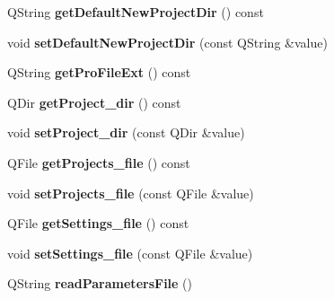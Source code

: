 \begin{DoxyCompactItemize}
\item 
Q\+String {\bfseries get\+Default\+New\+Project\+Dir} () const \hypertarget{class_app_settings_a8e09af00975757da8cd520b44db8b4cb}{}\label{class_app_settings_a8e09af00975757da8cd520b44db8b4cb}

\item 
void {\bfseries set\+Default\+New\+Project\+Dir} (const Q\+String \&value)\hypertarget{class_app_settings_a2416714eba17ee60f384cad00124fb9e}{}\label{class_app_settings_a2416714eba17ee60f384cad00124fb9e}

\item 
Q\+String {\bfseries get\+Pro\+File\+Ext} () const \hypertarget{class_app_settings_a540fcd15c9330cc015fab2f43aa79fc1}{}\label{class_app_settings_a540fcd15c9330cc015fab2f43aa79fc1}

\item 
Q\+Dir {\bfseries get\+Project\+\_\+dir} () const \hypertarget{class_app_settings_adc3c9af982f7e368ad741bee099010e0}{}\label{class_app_settings_adc3c9af982f7e368ad741bee099010e0}

\item 
void {\bfseries set\+Project\+\_\+dir} (const Q\+Dir \&value)\hypertarget{class_app_settings_a3060913c5f052852f5a2aa2802351c63}{}\label{class_app_settings_a3060913c5f052852f5a2aa2802351c63}

\item 
Q\+File {\bfseries get\+Projects\+\_\+file} () const \hypertarget{class_app_settings_a5b244cc47342a3a207a4bf855ef5660d}{}\label{class_app_settings_a5b244cc47342a3a207a4bf855ef5660d}

\item 
void {\bfseries set\+Projects\+\_\+file} (const Q\+File \&value)\hypertarget{class_app_settings_a0546a786ddf98f93187d7506e1a14e1c}{}\label{class_app_settings_a0546a786ddf98f93187d7506e1a14e1c}

\item 
Q\+File {\bfseries get\+Settings\+\_\+file} () const \hypertarget{class_app_settings_afe4308305b3178d6fa6f4adc767988a6}{}\label{class_app_settings_afe4308305b3178d6fa6f4adc767988a6}

\item 
void {\bfseries set\+Settings\+\_\+file} (const Q\+File \&value)\hypertarget{class_app_settings_ad793e27d5965a6480da5d6ce17820efe}{}\label{class_app_settings_ad793e27d5965a6480da5d6ce17820efe}

\item 
Q\+String {\bfseries read\+Parameters\+File} ()\hypertarget{class_app_settings_ab59a8b8480c4f02478e4bb67040ba348}{}\label{class_app_settings_ab59a8b8480c4f02478e4bb67040ba348}

\end{DoxyCompactItemize}
